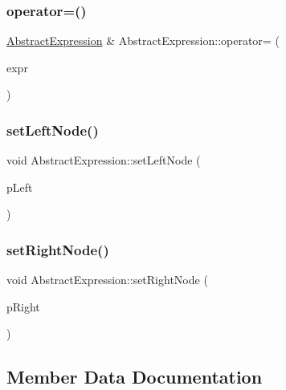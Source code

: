 \subsubsection{\texorpdfstring{operator=()}{operator=()}}
{\footnotesize\ttfamily \mbox{\hyperlink{class_abstract_expression}{Abstract\+Expression}} \& Abstract\+Expression\+::operator= (\begin{DoxyParamCaption}\item[{\mbox{\hyperlink{class_abstract_expression}{Abstract\+Expression}} \&\&}]{expr }\end{DoxyParamCaption})}

\mbox{\label{class_abstract_expression_a7091b8442f4b09ef967660e55cdac0e0}} 
\subsubsection{\texorpdfstring{setLeftNode()}{setLeftNode()}}
{\footnotesize\ttfamily void Abstract\+Expression\+::set\+Left\+Node (\begin{DoxyParamCaption}\item[{std\+::unique\+\_\+ptr$<$ \mbox{\hyperlink{class_abstract_expression}{Abstract\+Expression}} $>$ \&}]{p\+Left }\end{DoxyParamCaption})}

\mbox{\label{class_abstract_expression_af958794a4a5726a021bd791456b38708}} 
\subsubsection{\texorpdfstring{setRightNode()}{setRightNode()}}
{\footnotesize\ttfamily void Abstract\+Expression\+::set\+Right\+Node (\begin{DoxyParamCaption}\item[{std\+::unique\+\_\+ptr$<$ \mbox{\hyperlink{class_abstract_expression}{Abstract\+Expression}} $>$ \&}]{p\+Right }\end{DoxyParamCaption})}



\subsection{Member Data Documentation}
\mbox{\label{class_abstract_expression_aa68e09e96486147d27ed0ce807e97bc3}} 
